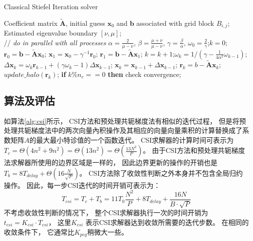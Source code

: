 \vspace{-10pt}
\begin{algorithm}[h]
\caption{Classical Stiefel Iteration solver}
\label{alg:csi}
\begin{algorithmic}[1]
\REQUIRE Coefficient matrix $\tilde{\textbf{A}}$, initial guess  $\textbf{x}_0$ and $\textbf{b}$ associated with grid block $B_{i,j}$; Estimated eigenvalue boundary $[\nu,\mu]$;  \\
 // \qquad    \textit{do in parallel with all processes}
\STATE $\alpha =\frac{2}{\mu -\nu}$, $ \beta = \frac{\mu +\nu}{\mu -\nu}$, $\gamma = \frac{\beta}{\alpha}$, $\omega_0 =\frac{ 2}{\gamma}$;\quad $k = 0$;
\STATE $\textbf{r}_0 = \textbf{b}-\tilde{\textbf{A}}\textbf{x}_0$; $\textbf{x}_1 =\textbf{x}_0 -\gamma^{-1}\textbf{r}_0$; $\textbf{r}_1 =\textbf{b} -\tilde{\textbf{A}}\textbf{x}_1$;
\STATE $k=k+1$;\quad $\omega_k = 1/(\gamma - \frac{1}{4\alpha^2}\omega_{k-1})$; 
\STATE $\Delta \textbf{x}_{k} =\omega_k\textbf{r}_{k-1}+(\gamma \omega_k-1)\Delta \textbf{x}_{k-1}$;
\STATE $\textbf{x}_{k} =\textbf{x}_{k-1}+\Delta \textbf{x}_{k-1}$; \quad  $\textbf{r}_{k} =b- \tilde{\textbf{A}}\textbf{x}_{k}$;
\STATE $update\_halo(\textbf{r}_k)$; 
\STATE \textbf{if} $k \%  n_{c} == 0$ \textbf{then}  check convergence; 
\ENDWHILE
\end{algorithmic}
\end{algorithm}
\vspace{-10pt}

\subsection{算法及评估}

如算法\ref{alg:csi}所示， CSI方法和预处理共轭梯度法有相似的迭代过程，
但是将预处理共轭梯度法中的两次向量內积操作及其相应的向量向量乘积的计算替换成了系数矩阵$A$的最大最小特诊值的一个函数迭代。 
CSI求解器的计算时间可表示为
$T_c = \Theta (4 n^2 + 9n^2) = \Theta (13n^2) =\Theta(\frac{13N^2}{P})$。 
由于CSI方法和预处理共轭梯度法求解器所使用的边界区域是一样的， 因此边界更新的操作的开销也是 $T_b =8T_{delay} +\Theta (16 \frac{N}{\sqrt{P}})$。 CSI方法除了收敛性判断之外本身并不包含全局归约操作。 
因此，每一步CSI迭代的时间开销可表示为： 　
\begin{equation}
\label{t_csi}
T_{csi} = T_c + T_b
= 11T_0 \frac{N^2}{P}+ 8T_{delay} + \frac{16N}{B \cdot\sqrt{P}}
\end{equation}
不考虑收敛性判断的情况下， 整个CSI求解器执行一次的时间开销为$t_{csi} = K_{csi}\cdot T_{csi}$， 这里$K_{csi}$ 表示CSI求解器达到收敛所需要的迭代步数。 在相同的收敛条件下， 它通常比$K_{pcg}$稍微大一些。 

